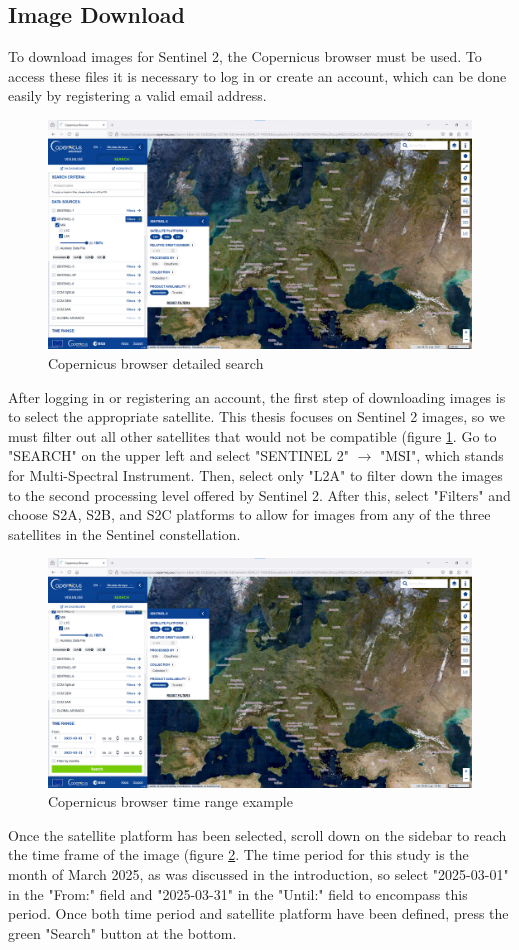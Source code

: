 \subsection{Image Download}
To download images for Sentinel 2, the Copernicus browser must be used. To access these files it is necessary to log in or create an account, which can be done easily by registering a valid email address. 
\begin{figure}[H]
    \centering
    \includegraphics[width=0.5\linewidth]{contents/figures/ME copernicus detailed search.jpg}
    \caption{Copernicus browser detailed search}
    \label{fig:ME copernicus detailed search}
\end{figure}
After logging in or registering an account, the first step of downloading images is to select the appropriate satellite. This thesis focuses on Sentinel 2 images, so we must filter out all other satellites that would not be compatible (figure \ref{fig:ME copernicus detailed search}. Go to "SEARCH" on the upper left and select "SENTINEL 2" $\rightarrow$ "MSI", which stands for Multi-Spectral Instrument. Then, select only "L2A" to filter down the images to the second processing level offered by Sentinel 2. After this, select "Filters" and choose S2A, S2B, and S2C platforms to allow for images from any of the three satellites in the Sentinel constellation.

\begin{figure}[H]
    \centering
    \includegraphics[width=0.5\linewidth]{contents/figures/ME copernicus time range.jpg}
    \caption{Copernicus browser time range example}
    \label{fig:ME copernicus time range}
\end{figure}
Once the satellite platform has been selected, scroll down on the sidebar to reach the time frame of the image (figure \ref{fig:ME copernicus time range}. The time period for this study is the month of March 2025, as was discussed in the introduction, so select "2025-03-01" in the "From:" field and "2025-03-31" in the "Until:" field to encompass this period. Once both time period and satellite platform have been defined, press the green "Search" button at the bottom. 

